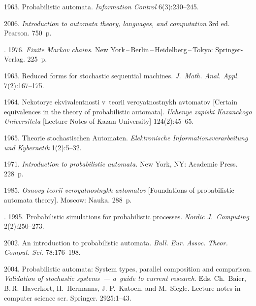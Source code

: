 
  \begin{multicols}{2}

\renewcommand{\bibname}{\protect\rmfamily References}

{\small\frenchspacing
 {%
 \begin{thebibliography}{99}
 1963. Probabilistic automata.
\textit{Information Control} 6(3):230--245.

2006. \textit{Introduction to automata theory, languages, and computation}
3rd ed. Pearson. 750~p.

.
1976. \textit{Finite Markov chains.}
New York\,--\,Berlin\,--\,Heidelberg\,--\,Tokyo: Springer-Verlag.
225~p.

1963. Reduced forms for stochastic sequential machines.
\textit{J.~Math. Anal. Appl.}
7(2):167--175.

1964. Nekotorye ekvivalentnosti v~teorii veroyatnostnykh avtomatov
[Certain equivalences in the theory of probabilistic automata].
\textit{Uchenye zapiski Kazanckogo Universiteta}
[Lecture Notes of Kazan University] 124(2):45--65.

1965. Theorie stochastischen Automaten.
\textit{Elektronische Informationsverarbeitung und Kybernetik} 1(2):5--32.

1971. \textit{Introduction to probabilistic automata.}
New York, NY: Academic Press. 228~p.

1985. \textit{Osnovy teorii veroyatnostnykh avtomatov}
[Foundations of probabilistic automata theory]. Moscow: Nauka.
288~p.

.
1995. Probabilistic simulations for probabilistic processes.
\textit{Nordic J.~Computing} 2(2):250--273.

2002. An introduction to probabilistic automata.
\textit{Bull. Eur. Assoc.  Theor. Comput. Sci.}
78:176--198.
{

}

2004.
Probabilistic automata: System types, parallel composition and comparison.
\textit{Validation of stochastic systems~--- a~guide to current research}.
Eds. Ch.~Baier, B.\,R.~Haverkort, H.~Hermanns, J.-P.~Katoen, and M.~Siegle.
Lecture notes in computer science ser. Springer. 2925:1--43.


\end{thebibliography}}}
\end{multicols}
